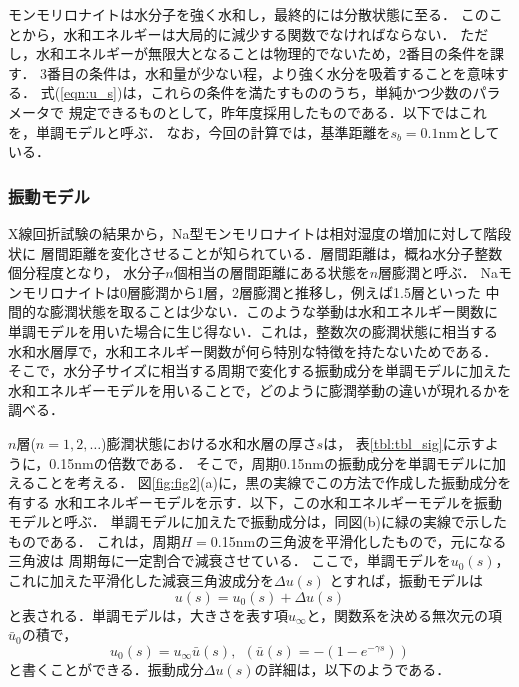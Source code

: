モンモリロナイトは水分子を強く水和し，最終的には分散状態に至る．
このことから，水和エネルギーは大局的に減少する関数でなければならない．
ただし，水和エネルギーが無限大となることは物理的でないため，2番目の条件を課す．
3番目の条件は，水和量が少ない程，より強く水分を吸着することを意味する．
式(\ref{eqn:u_s})は，これらの条件を満たすもののうち，単純かつ少数のパラメータで
規定できるものとして，昨年度採用したものである．以下ではこれを，単調モデルと呼ぶ．
なお，今回の計算では，基準距離を$s_b=0.1$nmとしている．
%
\subsubsection{振動モデル}
X線回折試験の結果から，Na型モンモリロナイトは相対湿度の増加に対して階段状に
層間距離を変化させることが知られている．層間距離は，概ね水分子整数個分程度となり，
水分子$n$個相当の層間距離にある状態を$n$層膨潤と呼ぶ．
Naモンモリロナイトは0層膨潤から1層，2層膨潤と推移し，例えば1.5層といった
中間的な膨潤状態を取ることは少ない．このような挙動は水和エネルギー関数に
単調モデルを用いた場合に生じ得ない．これは，整数次の膨潤状態に相当する
水和水層厚で，水和エネルギー関数が何ら特別な特徴を持たないためである．
そこで，水分子サイズに相当する周期で変化する振動成分を単調モデルに加えた
水和エネルギーモデルを用いることで，どのように膨潤挙動の違いが現れるかを調べる．

$n$層($n=1,2,\dots$)膨潤状態における水和水層の厚さ$s$は，
表\ref{tbl:tbl_sig}に示すように，0.15nmの倍数である．
そこで，周期0.15nmの振動成分を単調モデルに加えることを考える．
図\ref{fig:fig2}(a)に，黒の実線でこの方法で作成した振動成分を有する
水和エネルギーモデルを示す．以下，この水和エネルギーモデルを振動モデルと呼ぶ．
単調モデルに加えたで振動成分は，同図(b)に緑の実線で示したものである．
これは，周期$H=$0.15nmの三角波を平滑化したもので，元になる三角波は
周期毎に一定割合で減衰させている．
ここで，単調モデルを$u_0(s)$，これに加えた平滑化した減衰三角波成分を$\Delta u(s)$
とすれば，振動モデルは
\begin{equation}
	u(s)=u_0(s)+ \Delta u(s)
	\label{eqn:}
\end{equation}
と表される．単調モデルは，大きさを表す項$u_{\infty}$と，関数系を決める無次元の項
$\bar u_0$の積で，
\begin{equation}
	u_0(s)=u_{\infty} \bar{u}(s), \ \ (\bar{u}(s)=-(1-e^{-\gamma s}))
	\label{eqn:}
\end{equation}
と書くことができる．振動成分$\Delta u(s)$の詳細は，以下のようである．


